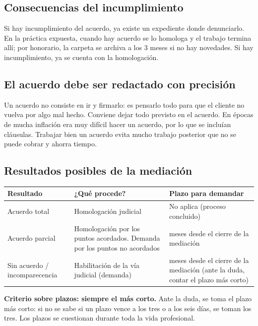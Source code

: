 \documentclass[12pt,oneside]{book}
\begin{document}
\subsection{Consecuencias del incumplimiento}

Si hay incumplimiento del acuerdo, ya existe un expediente donde denunciarlo. En la práctica expuesta, cuando hay acuerdo se lo homologa y el trabajo termina allí; por honorario, la carpeta se archiva a los 3 meses si no hay novedades. Si hay incumplimiento, ya se cuenta con la homologación.

\subsection{El acuerdo debe ser redactado con precisión}

Un acuerdo no consiste en ir y firmarlo: es pensarlo todo para que el cliente no vuelva por algo mal hecho. Conviene dejar todo previsto en el acuerdo. En épocas de mucha inflación era muy difícil hacer un acuerdo, por lo que se incluían cláusulas. Trabajar bien un acuerdo evita mucho trabajo posterior que no se puede cobrar y ahorra tiempo.

\subsection{Resultados posibles de la mediación}

\begin{table}[H]
\centering
\small
\begin{tabularx}{\textwidth}{>{\raggedright\arraybackslash}p{}>{\raggedright\arraybackslash}X>{\raggedright\arraybackslash}X}
\toprule
\textbf{Resultado} & \textbf{¿Qué procede?} & \textbf{Plazo para demandar} \\
\midrule
Acuerdo total & Homologación judicial & No aplica (proceso concluido) \\
Acuerdo parcial & Homologación por los puntos acordados. Demanda por los puntos no acordados & 6 meses desde el cierre de la mediación \\
Sin acuerdo / incomparecencia & Habilitación de la vía judicial (demanda) & 6 meses desde el cierre de la mediación (ante la duda, contar el plazo más corto) \\
\bottomrule
\end{tabularx}
\end{table}

\begin{important}
\textbf{Criterio sobre plazos: siempre el más corto.} Ante la duda, se toma el plazo más corto: si no se sabe si un plazo vence a los tres o a los seis días, se toman los tres. Los plazos se cuestionan durante toda la vida profesional.
\end{important}
\end{document}
